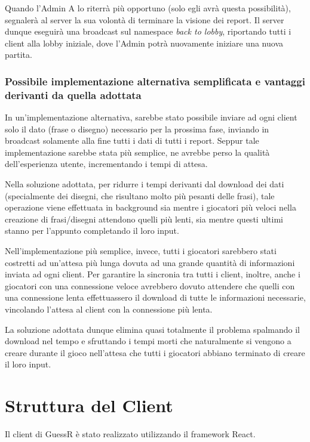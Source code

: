 \noindent Quando l'Admin A lo riterrà più opportuno (solo egli avrà questa possibilità), segnalerà al server la sua volontà di terminare la visione dei report. Il server dunque eseguirà una broadcast sul namespace \textit{back to lobby}, riportando tutti i client alla lobby iniziale, dove l'Admin potrà nuovamente iniziare una nuova partita.\newline

\subsubsection{Possibile implementazione alternativa semplificata e vantaggi derivanti da quella adottata}
\noindent In un'implementazione alternativa, sarebbe stato possibile inviare ad ogni client solo il dato (frase o disegno) necessario per la prossima fase, inviando in broadcast solamente alla fine tutti i dati di tutti i report.\newline
Seppur tale implementazione sarebbe stata più semplice, ne avrebbe perso la qualità dell'esperienza utente, incrementando i tempi di attesa.\newline

\noindent Nella soluzione adottata, per ridurre i tempi derivanti dal download dei dati (specialmente dei disegni, che risultano molto più pesanti delle frasi), tale operazione viene effettuata in background sia mentre i giocatori più veloci nella creazione di frasi/disegni attendono quelli più lenti, sia mentre questi ultimi stanno per l'appunto completando il loro input.\newline

\noindent Nell'implementazione più semplice, invece, tutti i giocatori sarebbero stati costretti ad un'attesa più lunga dovuta ad una grande quantità di informazioni inviata ad ogni client. Per garantire la sincronia tra tutti i client, inoltre, anche i giocatori con una connessione veloce avrebbero dovuto attendere che quelli con una connessione lenta effettuassero il download di tutte le informazioni necessarie, vincolando l'attesa al client con la connessione più lenta.\newline

\noindent La soluzione adottata dunque elimina quasi totalmente il problema spalmando il download nel tempo e sfruttando i tempi morti che naturalmente si vengono a creare durante il gioco nell'attesa che tutti i giocatori abbiano terminato di creare il loro input.

\section{Struttura del Client}
Il client di GuessR è stato realizzato utilizzando il framework React.\newline


